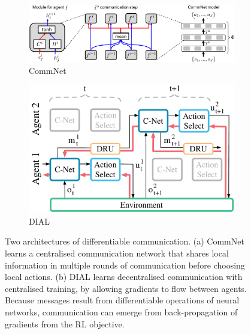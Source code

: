 \begin{figure}
    \centering
    \begin{subfigure}[b]{0.88\textwidth}
        \centering
        \includegraphics[width=\textwidth]{Figures/MADRL/commnet.png}
        \caption{CommNet~\citep{Sukhbaatar2016_CommNet}}
        \label{fig:CommNet}
    \end{subfigure}
    \begin{subfigure}[b]{0.52\textwidth}
        \centering
        \includegraphics[width=\textwidth]{Figures/MADRL/dial.png}
        \caption{DIAL~\citep{Foerster2016_DIAL}}
        \label{fig:DIAL}
    \end{subfigure}
    \caption{Two architectures of differentiable communication. (a) CommNet learns a centralised communication network that shares local information in multiple rounds of communication before choosing local actions. (b) DIAL learns decentralised communication with centralised training, by allowing gradients to flow between agents. Because messages result from differentiable operations of neural networks, communication can emerge from back-propagation of gradients from the RL objective.}
\end{figure}

